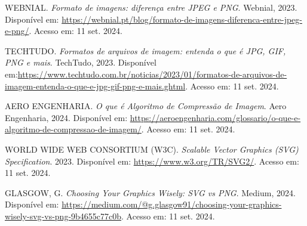\documentclass[12pt]{report}
\begin{document}
	
	\begin{thebibliography}{9}
		WEBNIAL. \textit{Formato de imagens: diferença entre JPEG e PNG}. Webnial, 2023. Disponível em: \url{https://webnial.pt/blog/formato-de-imagens-diferenca-entre-jpeg-e-png/}. Acesso em: 11 set. 2024.
		
		TECHTUDO. \textit{Formatos de arquivos de imagem: entenda o que é JPG, GIF, PNG e mais}. TechTudo, 2023. Disponível em:\url{https://www.techtudo.com.br/noticias/2023/01/formatos-de-arquivos-de-imagem-entenda-o-que-e-jpg-gif-png-e-mais.ghtml}. Acesso em: 11 set. 2024.
		
		AERO ENGENHARIA. \textit{O que é Algoritmo de Compressão de Imagem}. Aero Engenharia, 2024. Disponível em: \url{https://aeroengenharia.com/glossario/o-que-e-algoritmo-de-compressao-de-imagem/}. Acesso em: 11 set. 2024.
		
		WORLD WIDE WEB CONSORTIUM (W3C). \textit{Scalable Vector Graphics (SVG) Specification}. 2023. Disponível em: \url{https://www.w3.org/TR/SVG2/}.
		Acesso em: 11 set. 2024.
				
		GLASGOW, G. \textit{Choosing Your Graphics Wisely: SVG vs PNG}. Medium, 2024. Disponível em: \url{https://medium.com/@g.glasgow91/choosing-your-graphics-wisely-svg-vs-png-9b4655c77c0b}. Acesso em: 11 set. 2024.
		
	\end{thebibliography}
	
\end{document}
